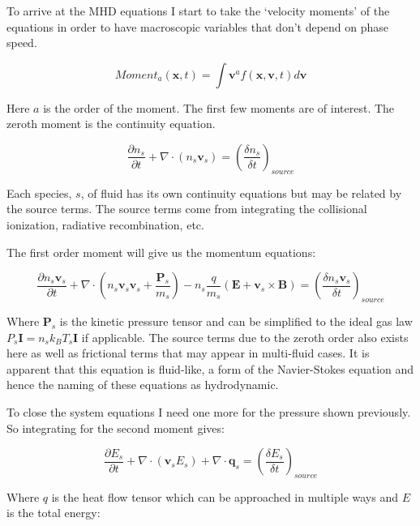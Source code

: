 \documentclass[12pt,upcase]{umlthesis}
\begin{document}
To arrive at the MHD equations I start to take the `velocity moments' of the equations in order to have macroscopic variables that don't depend on phase speed.

\begin{equation}
	{Moment}_a(\textbf{x}, t) = \int{\textbf{v}^a f(\textbf{x}, \textbf{v}, t)}d\textbf{v}
\end{equation}

Here $a$ is the order of the moment. The first few moments are of interest. The zeroth moment is the continuity equation.

\begin{equation}\label{eq:continuityequation}
	\frac{\partial n_s}{\partial t} + \nabla \cdot (n_s \textbf{v}_s) = {(\frac{\delta n_s}{\delta t})}_{source}
\end{equation}

Each species, $s$, of fluid has its own continuity equations but may be related by the source terms. The source terms come from integrating the collisional ionization, radiative recombination, etc.

The first order moment will give us the momentum equations:

\begin{equation}\label{eq:momentumequation}
	\frac{\partial n_s \textbf{v}_s}{\partial t} + \nabla \cdot (n_s \textbf{v}_s \textbf{v}_s + \frac{\textbf{P}_s}{m_s} ) -n_s \frac{q}{m_s}(\textbf{E} + \textbf{v}_s \times \textbf{B}) = {(\frac{\delta n_s \textbf{v}_s}{\delta t})}_{source}
\end{equation}

Where $\textbf{P}_s$ is the kinetic pressure tensor and can be simplified to the ideal gas law $P_s\textbf{I} = n_s k_B T_s \textbf{I}$ if applicable. The source terms due to the zeroth order also exists here as well as frictional terms that may appear in multi-fluid cases. It is apparent that this equation is fluid-like, a form of the Navier-Stokes equation and hence the naming of these equations as hydrodynamic.

To close the system equations I need one more for the pressure shown previously. So integrating for the second moment gives:

\begin{equation}\label{eq:energyequation}
	\frac{\partial E_s}{\partial t} + \nabla \cdot (\textbf{v}_s E_s) + \nabla \cdot \textbf{q}_s = {(\frac{\delta E_s}{\delta t})}_{source}
\end{equation}

Where $q$ is the heat flow tensor which can be approached in multiple ways and $E$ is the total energy:
\end{document}
